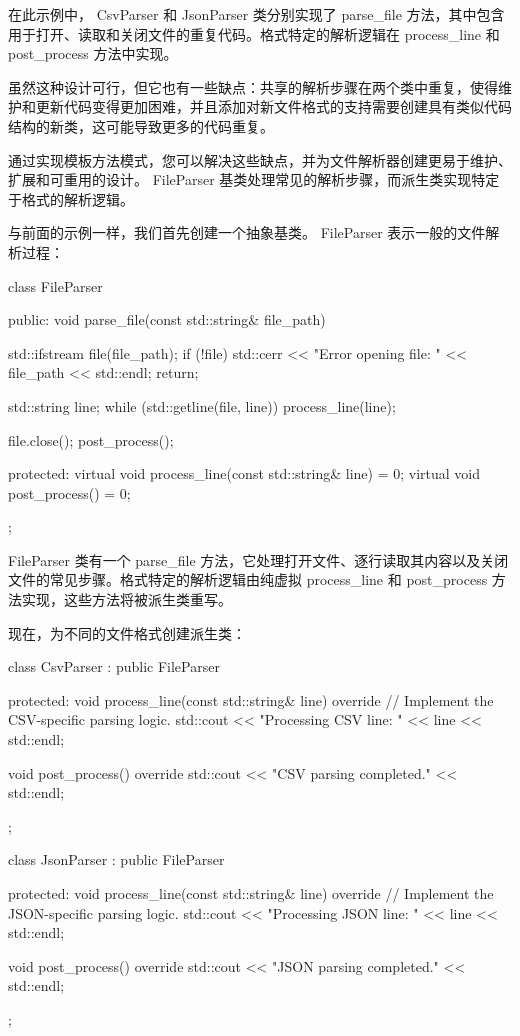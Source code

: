 在此示例中， CsvParser 和 JsonParser 类分别实现了 parse\_file 方法，其中包含用于打开、读取和关闭文件的重复代码。格式特定的解析逻辑在 process\_line 和 post\_process 方法中实现。

虽然这种设计可行，但它也有一些缺点：共享的解析步骤在两个类中重复，使得维护和更新代码变得更加困难，并且添加对新文件格式的支持需要创建具有类似代码结构的新类，这可能导致更多的代码重复。

通过实现模板方法模式，您可以解决这些缺点，并为文件解析器创建更易于维护、扩展和可重用的设计。 FileParser 基类处理常见的解析步骤，而派生类实现特定于格式的解析逻辑。

与前面的示例一样，我们首先创建一个抽象基类。 FileParser 表示一般的文件解析过程：

\begin{cpp}
class FileParser {
public:
    void parse_file(const std::string& file_path) {
        std::ifstream file(file_path);
        if (!file) {
            std::cerr << "Error opening file: " << file_path << std::endl;
            return;
        }

        std::string line;
        while (std::getline(file, line)) {
            process_line(line);
        }

        file.close();
        post_process();
    }

protected:
    virtual void process_line(const std::string& line) = 0;
    virtual void post_process() = 0;
};
\end{cpp}

FileParser 类有一个 parse\_file 方法，它处理打开文件、逐行读取其内容以及关闭文件的常见步骤。格式特定的解析逻辑由纯虚拟 process\_line 和 post\_process 方法实现，这些方法将被派生类重写。

现在，为不同的文件格式创建派生类：

\begin{cpp}
class CsvParser : public FileParser {
protected:
    void process_line(const std::string& line) override {
        // Implement the CSV-specific parsing logic.
        std::cout << "Processing CSV line: " << line << std::endl;
    }

    void post_process() override {
        std::cout << "CSV parsing completed." << std::endl;
    }
};

class JsonParser : public FileParser {
protected:
    void process_line(const std::string& line) override {
        // Implement the JSON-specific parsing logic.
        std::cout << "Processing JSON line: " << line << std::endl;
    }

    void post_process() override {
        std::cout << "JSON parsing completed." << std::endl;
    }
};
\end{cpp}

